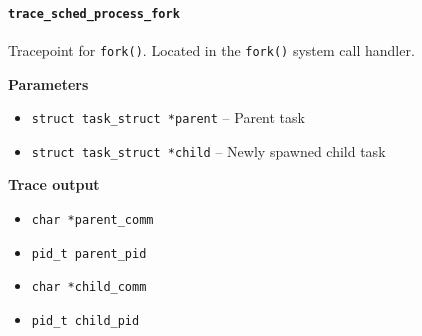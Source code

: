 \paragraph{\texttt{trace\_sched\_process\_fork}}
Tracepoint for \verb|fork()|. Located in the \verb|fork()| system call handler.

\textbf{Parameters}
\begin{itemize}
    \item \verb|struct task_struct *parent| -- Parent task
    \item \verb|struct task_struct *child| -- Newly spawned child task
\end{itemize}

\textbf{Trace output}
\begin{itemize}
    \item \verb|char *parent_comm|
    \item \verb|pid_t parent_pid|
    \item \verb|char *child_comm|
    \item \verb|pid_t child_pid|
\end{itemize}

